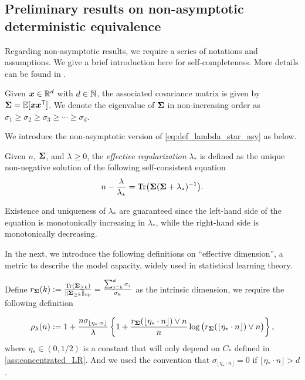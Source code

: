 \subsection{Preliminary results on non-asymptotic deterministic equivalence}\label{app:pre_non-asy_deter_equiv}

Regarding non-asymptotic results, we require a series of notations and assumptions. We give a brief introduction here for self-completeness. More details can be found in \citet{cheng2022dimension,misiakiewicz2024non,defilippis2024dimension}.

Given ${\boldsymbol x} \in \mathbb{R}^d$ with $d \in {\mathbb N}$, the associated covariance matrix is given by ${\boldsymbol \Sigma} = \mathbb{E}[{\boldsymbol x} {\boldsymbol x}^{\mathsf T}]$. We denote the eigenvalue of ${\boldsymbol \Sigma}$ in non-increasing order as $\sigma_1 \geq \sigma_2 \geq \sigma_3 \geq \cdots \geq \sigma_d$. 

We introduce the non-asymptotic version of \cref{eq:def_lambda_star_asy} as below.
\begin{definition}\label{def:effective_regularization}
    Given $n$, ${\boldsymbol \Sigma}$, and $\lambda \geq 0$, the \emph{effective regularization} $\lambda_*$ is defined as the unique non-negative solution of the following self-consistent equation
    \begin{equation*}
        n - \frac{\lambda}{\lambda_*} = {\rm Tr} \big( {\boldsymbol \Sigma} ( {\boldsymbol \Sigma} + \lambda_* )^{-1} \big).
    \end{equation*}
\end{definition}
Existence and uniqueness of $\lambda_*$ are guaranteed since the left-hand side of the equation is monotonically increasing in $\lambda_*$, while the right-hand side is monotonically decreasing. 

In the next, we introduce the following definitions on ``effective dimension'', a metric to describe the model capacity, widely used in statistical learning theory.

Define \(r_{{\boldsymbol \Sigma}}(k) := \frac{{\rm Tr}({\boldsymbol \Sigma}_{\geq k})}{\| {\boldsymbol \Sigma}_{\geq k} \|_{\rm op}} = \frac{\sum_{j=k}^d \sigma_j}{\sigma_k}\) as the intrinsic dimension, we require the following definition

\begin{equation}\label{eq:rho_lambda}
    \rho_{\lambda} (n) := 1 +  \frac{n \sigma_{\lfloor \eta_* \cdot n \rfloor}}{\lambda}\left\{ 1 + \frac{r_{{\boldsymbol \Sigma}} (\lfloor \eta_* \cdot n \rfloor) \vee n}{n} \log \big(r_{{\boldsymbol \Sigma}} (\lfloor \eta_* \cdot n \rfloor) \vee n \big) \right\},
\end{equation}
where $\eta_* \in (0,1/2)$ is a constant that will only depend on $C_*$ defined in \cref{ass:concentrated_LR}. And we used the convention that $\sigma_{\lfloor \eta_* \cdot n \rfloor} = 0$ if $\lfloor \eta_* \cdot n \rfloor > d$.



